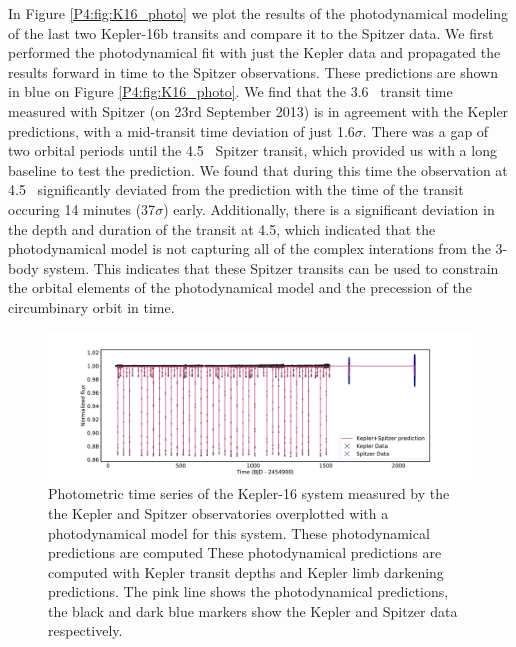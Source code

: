 In Figure \ref{P4:fig:K16_photo} we plot the results of the photodynamical modeling of the last two Kepler-16b transits and compare it to the Spitzer data.
We first performed the photodynamical fit with just the Kepler data and propagated the results forward in time to the Spitzer observations. These predictions are shown in blue on Figure \ref{P4:fig:K16_photo}. We find that the 3.6\um~ transit time measured with Spitzer (on 23rd September 2013) is in agreement with the Kepler predictions, with a mid-transit time deviation of just 1.6$\sigma$. There was a gap of two orbital periods until the 4.5\um~ Spitzer transit, which provided us with a long baseline to test the prediction. We found that during this time the observation at 4.5\um~ significantly deviated from the prediction with the time of the transit occuring 14 minutes (37$\sigma$) early. Additionally, there is a significant deviation in the depth and duration of the transit at 4.5\um, which indicated that the photodynamical model is not capturing all of the complex interations from the 3-body system. This indicates that these Spitzer transits can be used to constrain the orbital elements of the photodynamical model and the precession of the circumbinary orbit in time.

\begin{figure}
    \centering
    \includegraphics[trim={3cm 0 3cm 0},clip,width=\linewidth]{Kepler16b_photodynamicalmodel.pdf}
    \caption{Photometric time series of the Kepler-16 system measured by the the Kepler and Spitzer observatories overplotted with a photodynamical model for this system. These photodynamical predictions are computed These photodynamical predictions are computed with Kepler transit depths and Kepler limb darkening predictions. The pink line shows the photodynamical predictions, the black and dark blue markers show the Kepler and Spitzer data respectively.}
    \label{P4:fig:K16_model}
\end{figure}


